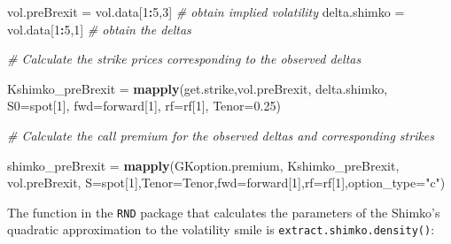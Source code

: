 \documentclass[]{book}
\newenvironment{Shaded}{\begin{snugshade}}{\end{snugshade}}
\newcommand{\KeywordTok}[1]{\textcolor[rgb]{0.13,0.29,0.53}{\textbf{#1}}}
\newcommand{\DataTypeTok}[1]{\textcolor[rgb]{0.13,0.29,0.53}{#1}}
\newcommand{\DecValTok}[1]{\textcolor[rgb]{0.00,0.00,0.81}{#1}}
\newcommand{\FloatTok}[1]{\textcolor[rgb]{0.00,0.00,0.81}{#1}}
\newcommand{\StringTok}[1]{\textcolor[rgb]{0.31,0.60,0.02}{#1}}
\newcommand{\CommentTok}[1]{\textcolor[rgb]{0.56,0.35,0.01}{\textit{#1}}}
\newcommand{\OperatorTok}[1]{\textcolor[rgb]{0.81,0.36,0.00}{\textbf{#1}}}
\newcommand{\NormalTok}[1]{#1}
\theoremstyle{definition}
\theoremstyle{definition}
\theoremstyle{definition}
\theoremstyle{remark}
\begin{document}
\begin{Shaded}
\begin{Highlighting}[]
\NormalTok{vol.preBrexit =}\StringTok{ }\NormalTok{vol.data[}\DecValTok{1}\OperatorTok{:}\DecValTok{5}\NormalTok{,}\DecValTok{3}\NormalTok{]         }\CommentTok{# obtain implied volatility}
\NormalTok{delta.shimko =}\StringTok{ }\NormalTok{vol.data[}\DecValTok{1}\OperatorTok{:}\DecValTok{5}\NormalTok{,}\DecValTok{1}\NormalTok{]          }\CommentTok{# obtain the deltas}

\CommentTok{# Calculate the strike prices corresponding to the observed deltas}

\NormalTok{Kshimko_preBrexit =}\StringTok{ }\KeywordTok{mapply}\NormalTok{(get.strike,vol.preBrexit, delta.shimko,}
                     \DataTypeTok{S0=}\NormalTok{spot[}\DecValTok{1}\NormalTok{], }\DataTypeTok{fwd=}\NormalTok{forward[}\DecValTok{1}\NormalTok{], }\DataTypeTok{rf=}\NormalTok{rf[}\DecValTok{1}\NormalTok{], }\DataTypeTok{Tenor=}\FloatTok{0.25}\NormalTok{)}

\CommentTok{# Calculate the call premium for the observed deltas and corresponding strikes}

\NormalTok{shimko_preBrexit =}\StringTok{ }\KeywordTok{mapply}\NormalTok{(GKoption.premium, Kshimko_preBrexit, vol.preBrexit,}
                        \DataTypeTok{S=}\NormalTok{spot[}\DecValTok{1}\NormalTok{],}\DataTypeTok{Tenor=}\NormalTok{Tenor,}\DataTypeTok{fwd=}\NormalTok{forward[}\DecValTok{1}\NormalTok{],}\DataTypeTok{rf=}\NormalTok{rf[}\DecValTok{1}\NormalTok{],}\DataTypeTok{option_type=}\StringTok{"c"}\NormalTok{)}
\end{Highlighting}
\end{Shaded}

The function in the \texttt{RND} package that calculates the parameters
of the Shimko's quadratic approximation to the volatility smile is
\texttt{extract.shimko.density()}:
\end{document}
